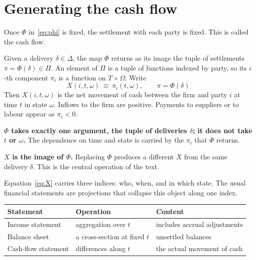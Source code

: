 \section{Generating the cash flow}
\label{sec:cashflow}

Once $\Phi$ in~\eqref{eq:phi} is fixed, the settlement with each party is fixed. This is
called the cash flow.

\begin{definition}
Given a delivery $\delta\in\Delta$, the map $\Phi$ returns as its image the tuple of
settlements $\pi = \Phi(\delta) \in \Pi$. An element of $\Pi$ is a tuple of functions
indexed by party, so its $i$-th component $\pi_i$ is a function on $T\times\Omega$. Write
\begin{equation}
X(i,t,\omega) \ \equiv\ \pi_i(t,\omega), \qquad \pi = \Phi(\delta)
\label{eq:X}
\end{equation}
Then $X(i,t,\omega)$ is the net movement of cash between the firm and party $i$ at time $t$
in state $\omega$. Inflows to the firm are positive. Payments to suppliers or to labour
appear as $\pi_i<0$.
\end{definition}

\textbf{$\Phi$ takes exactly one argument, the tuple of deliveries $\delta$; it does not
take $t$ or $\omega$.} The dependence on time and state is carried by the $\pi_i$ that
$\Phi$ returns.

\textbf{$X$ is the image of $\Phi$.} Replacing $\Phi$ produces a different $X$ from the
same delivery $\delta$. This is the central operation of the text.

Equation~\eqref{eq:X} carries three indices: who, when, and in which state. The usual
financial statements are projections that collapse this object along one index.

\begin{center}
\begin{tabularx}{\textwidth}{@{}llX@{}}
\toprule
Statement & Operation & Content \\
\midrule
Income statement & aggregation over $t$ & includes accrual adjustments \\
Balance sheet & a cross-section at fixed $t$ & unsettled balances \\
Cash-flow statement & differences along $t$ & the actual movement of cash \\
\bottomrule
\end{tabularx}
\label{tab:statements-projection}
\end{center}

